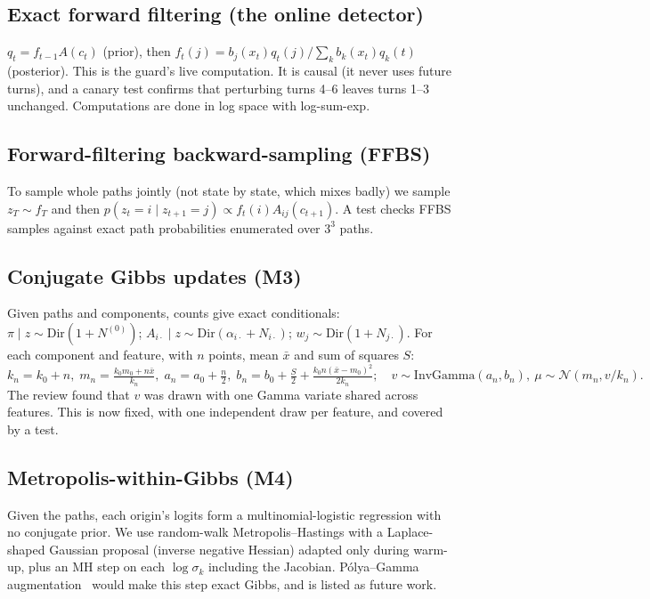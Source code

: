 \documentclass[11pt]{article}
\begin{document}
\subsection{Exact forward filtering (the online detector)}
$q_t=f_{t-1}A(c_t)$ (prior), then $f_t(j)=b_j(x_t)q_t(j)/\sum_k b_k(x_t)q_k(t)$ (posterior). This is the guard's live computation. It is causal (it never uses future turns), and a canary test confirms that perturbing turns 4--6 leaves turns 1--3 unchanged. Computations are done in log space with log-sum-exp.

\subsection{Forward-filtering backward-sampling (FFBS)}
To sample whole paths jointly (not state by state, which mixes badly) we sample $z_T\sim f_T$ and then $p(z_t{=}i\mid z_{t+1}{=}j)\propto f_t(i)A_{ij}(c_{t+1})$. A test checks FFBS samples against exact path probabilities enumerated over $3^3$ paths.

\subsection{Conjugate Gibbs updates (M3)}
Given paths and components, counts give exact conditionals: $\pi\mid z\sim\mathrm{Dir}(1+N^{(0)})$; $A_{i\cdot}\mid z\sim\mathrm{Dir}(\alpha_{i\cdot}+N_{i\cdot})$; $w_j\sim\mathrm{Dir}(1+N_{j\cdot})$. For each component and feature, with $n$ points, mean $\bar x$ and sum of squares $S$:
\[ k_n=k_0+n,\; m_n=\tfrac{k_0m_0+n\bar x}{k_n},\; a_n=a_0+\tfrac n2,\; b_n=b_0+\tfrac S2+\tfrac{k_0n(\bar x-m_0)^2}{2k_n};\quad v\sim\mathrm{InvGamma}(a_n,b_n),\ \mu\sim\mathcal N(m_n,v/k_n). \]
The review found that $v$ was drawn with one Gamma variate shared across features. This is now fixed, with one independent draw per feature, and covered by a test.

\subsection{Metropolis-within-Gibbs (M4)}
Given the paths, each origin's logits form a multinomial-logistic regression with no conjugate prior. We use random-walk Metropolis--Hastings with a Laplace-shaped Gaussian proposal (inverse negative Hessian) adapted only during warm-up, plus an MH step on each $\log\sigma_k$ including the Jacobian. P\'olya--Gamma augmentation~\cite{holsclaw} would make this step exact Gibbs, and is listed as future work.
\end{document}
